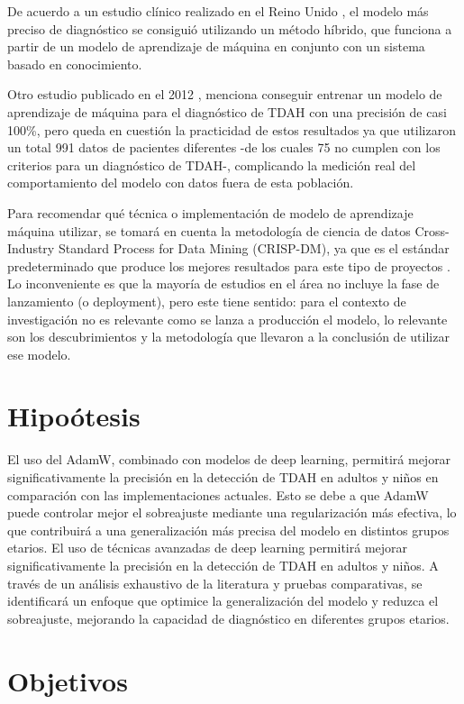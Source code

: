 \documentclass[10pt,journal,compsoc]{IEEEtran}
\begin{document}
De acuerdo a un estudio clínico realizado en el Reino Unido \cite{chen-2023}, el modelo más preciso de diagnóstico se consiguió utilizando un método híbrido, que funciona a partir de un modelo de aprendizaje de máquina en conjunto con un sistema basado en conocimiento.

Otro estudio publicado en el 2012 \cite{wall-2012}, menciona conseguir entrenar un modelo de aprendizaje de máquina para el diagnóstico de TDAH con una precisión de casi 100\%, pero queda en cuestión la practicidad de estos resultados ya que utilizaron un total 991 datos de pacientes diferentes -de los cuales 75 no cumplen con los criterios para un diagnóstico de TDAH-, complicando la medición real del comportamiento del modelo con datos fuera de esta población.

Para recomendar qué técnica o implementación de modelo de aprendizaje máquina utilizar, se tomará en cuenta la metodología de ciencia de datos Cross-Industry Standard Process for Data Mining (CRISP-DM), ya que es el estándar predeterminado que produce los mejores resultados para este tipo de proyectos \cite{schroer-2021}. Lo inconveniente es que la mayoría de estudios en el área no incluye la fase de lanzamiento (o deployment), pero este tiene sentido: para el contexto de investigación no es relevante como se lanza a producción el modelo, lo relevante son los descubrimientos y la metodología que llevaron a la conclusión de utilizar ese modelo.

\section{Hipoótesis}
El uso del AdamW, combinado con modelos de deep learning, permitirá mejorar significativamente la precisión en la detección de TDAH en adultos y niños en comparación con las implementaciones actuales. Esto se debe a que AdamW puede controlar mejor el sobreajuste mediante una regularización más efectiva, lo que contribuirá a una generalización más precisa del modelo en distintos grupos etarios.
El uso de técnicas avanzadas de deep learning permitirá mejorar significativamente la precisión en la detección de TDAH en adultos y niños. A través de un análisis exhaustivo de la literatura y pruebas comparativas, se identificará un enfoque que optimice la generalización del modelo y reduzca el sobreajuste, mejorando la capacidad de diagnóstico en diferentes grupos etarios.

\section{Objetivos}
\end{document}
